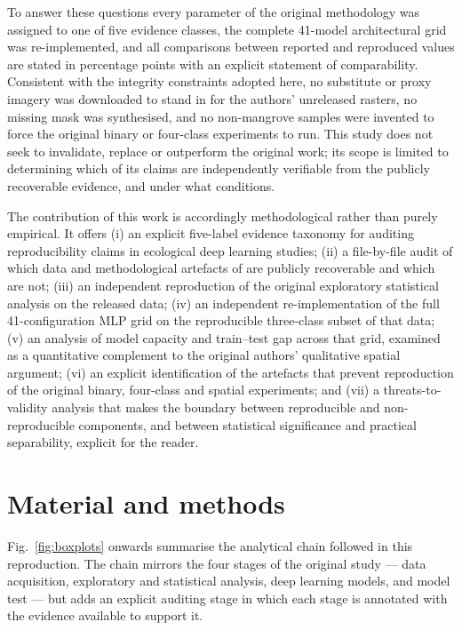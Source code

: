 \documentclass[10pt,twocolumn,a4paper]{article}
\begin{document}
To answer these questions every parameter of the original methodology was assigned to one of five
evidence classes, the complete 41-model architectural grid was re-implemented, and all comparisons
between reported and reproduced values are stated in percentage points with an explicit statement
of comparability. Consistent with the integrity constraints adopted here, no substitute or proxy
imagery was downloaded to stand in for the authors' unreleased rasters, no missing mask was
synthesised, and no non-mangrove samples were invented to force the original binary or four-class
experiments to run. This study does not seek to invalidate, replace or outperform the original
work; its scope is limited to determining which of its claims are independently verifiable from
the publicly recoverable evidence, and under what conditions.

The contribution of this work is accordingly methodological rather than purely empirical. It
offers (i) an explicit five-label evidence taxonomy for auditing reproducibility claims in
ecological deep learning studies; (ii) a file-by-file audit of which data and methodological
artefacts of \citet{monterrubio2025} are publicly recoverable and which are not; (iii) an
independent reproduction of the original exploratory statistical analysis on the released data;
(iv) an independent re-implementation of the full 41-configuration MLP grid on the reproducible
three-class subset of that data; (v) an analysis of model capacity and train--test gap across that
grid, examined as a quantitative complement to the original authors' qualitative spatial
argument; (vi) an explicit identification of the artefacts that prevent reproduction of the
original binary, four-class and spatial experiments; and (vii) a threats-to-validity analysis that
makes the boundary between reproducible and non-reproducible components, and between statistical
significance and practical separability, explicit for the reader.

\section{Material and methods}
\label{sec:methods}

Fig.~\ref{fig:boxplots} onwards summarise the analytical chain followed in this reproduction. The
chain mirrors the four stages of the original study --- data acquisition, exploratory and
statistical analysis, deep learning models, and model test --- but adds an explicit auditing stage
in which each stage is annotated with the evidence available to support it.
\end{document}
